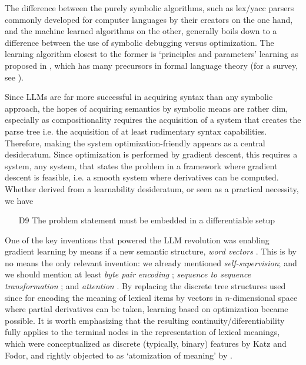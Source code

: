 \documentclass[output=paper,colorlinks=true,citecolor=brown]{langscibook}
\begin{document}
The difference between the purely symbolic algorithms, such as lex/yacc
par\-sers commonly developed for computer languages by their creators on the
one hand, and the machine learned algorithms on the other, generally boils down
to a difference between the use of symbolic debugging versus optimization. The
learning algorithm closest to the former is `principles and parameters'
learning as proposed in \citet{Chomsky:1993}, which has many precursors in
formal language theory (for a survey, see \cite{Angluin:1980}).

Since LLMs are far more successful in acquiring syntax than any symbolic
approach, the hopes of acquiring semantics by symbolic means are rather dim,
especially as compositionality requires the acquisition of a system that
creates the parse tree i.e. the acquisition of at least rudimentary syntax
capabilities. Therefore, making the system optimization-friendly appears as a
central desideratum. Since optimization is performed by gradient descent, this
requires a system, any system, that states the problem in a framework where
gradient descent is feasible, i.e. a smooth system where derivatives can
be computed. Whether derived from a learnability desideratum, or seen as a
practical necessity, we have

\begin{itemize}
\item[D9] The problem statement must be embedded in a differentiable setup
\end{itemize}

One of the key inventions that powered the LLM revolution was enabling
gradient learning by means if a new semantic structure, {\it word vectors}
\citep{Schutze:1993,Collobert:2011}. This is by no means the only relevant
invention: we already mentioned {\it self-supervision}; and we should mention
at least {\it byte pair encoding} \citep{Gage:1994}; {\it sequence to sequence
  transformation} \citep{Sutskever:2014}; and {\it attention}
\citep{Vaswani:2017}. By replacing the discrete tree structures used since
\citet{Katz:1963} for encoding the meaning of lexical items by vectors in
$n$-dimensional space where partial derivatives can be taken, learning based
on optimization became possible. It is worth emphasizing that the resulting
continuity/diferentiability fully applies to the terminal nodes in the
representation of lexical meanings, which were conceptualized as discrete
(typically, binary) features by Katz and Fodor, and rightly objected to as
`atomization of meaning' by \citet{Bolinger:1965b}. 
\end{document}
